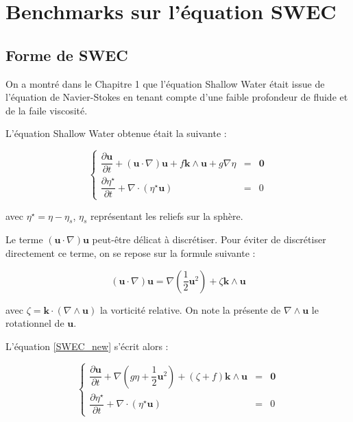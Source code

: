 \chapter{Benchmarks sur l'équation SWEC}

\section{Forme de SWEC}

On a montré dans le Chapitre 1 que l'équation Shallow Water était issue de l'équation de Navier-Stokes en tenant compte d'une faible profondeur de fluide et de la faile viscosité.

L'équation Shallow Water obtenue était la suivante :

\begin{equation}
\label{SWEC_new}
\left\lbrace
\begin{array}{rcl}
\dfrac{\partial \mathbf{u}}{\partial t} + \left( \mathbf{u} \cdot \nabla \right) \mathbf{u} + f \mathbf{k} \wedge \mathbf{u} + g \nabla \eta & = & \mathbf{0} \\
\dfrac{\partial \eta^{\star}}{\partial t} + \nabla \cdot \left( \eta^{\star} \mathbf{u} \right) & = & 0
\end{array}
\right.
\end{equation}

avec $\eta^{\star} = \eta - \eta_s$, $\eta_s$ représentant les reliefs sur la sphère.

Le terme $\left( \mathbf{u} \cdot \nabla \right) \mathbf{u}$ peut-être délicat à discrétiser. Pour éviter de discrétiser directement ce terme, on se repose sur la formule suivante :

\begin{equation}
\left( \mathbf{u} \cdot \nabla \right) \mathbf{u} = \nabla \left( \dfrac{1}{2} \mathbf{u}^2 \right) + \zeta \mathbf{k} \wedge \mathbf{u}
\end{equation}

avec $\zeta = \mathbf{k} \cdot \left( \nabla \wedge \mathbf{u} \right)$ la vorticité relative. On note la présente de $\nabla \wedge \mathbf{u}$ le rotationnel de $\mathbf{u}$.

L'équation \eqref{SWEC_new} s'écrit alors :

\begin{equation}
\label{SWEC_vectform}
\left\lbrace
\begin{array}{rcl}
\dfrac{\partial \mathbf{u}}{\partial t} + \nabla \left( g \eta + \dfrac{1}{2} \mathbf{u}^2  \right) + \left( \zeta + f \right) \mathbf{k} \wedge \mathbf{u} & = & \mathbf{0} \\
\dfrac{\partial \eta^{\star}}{\partial t} + \nabla \cdot \left( \eta^{\star} \mathbf{u} \right) & = & 0
\end{array}
\right.
\end{equation}

